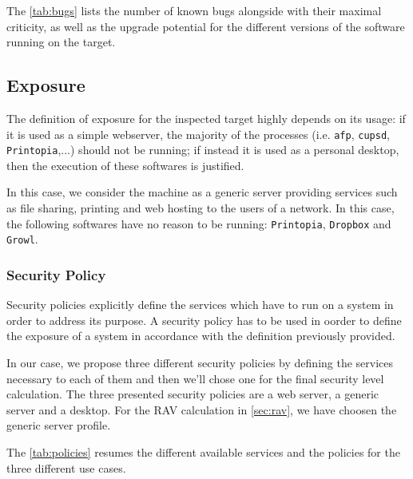 \documentclass[10pt,a4paper,twoside,onecolumn]{article}
\begin{document}
The \autoref{tab:bugs} lists the number of known bugs alongside with their maximal criticity, as well as the upgrade potential for the different versions of the software running on the target.


\subsection{Exposure}

The definition of exposure for the inspected target highly depends on its usage: if it is used as a simple webserver, the majority of the processes (i.e. \texttt{afp}, \texttt{cupsd}, \texttt{Printopia},...) should not be running; if instead it is used as a personal desktop, then the execution of these softwares is justified.

In this case, we consider the machine as a generic server providing services such as file sharing, printing and web hosting to the users of a network. In this case, the following softwares have no reason to be running: \texttt{Printopia}, \texttt{Dropbox} and \texttt{Growl}.

\subsubsection{Security Policy}

Security policies explicitly define the services which have to run on a system in order to address its purpose. A security policy has to be used in oorder to define the exposure of a system in accordance with the definition previously provided.

In our case, we propose three different security policies by defining the services necessary to each of them and then we'll chose one for the final security level calculation. The three presented security policies are a web server, a generic server and a desktop. For the RAV calculation in \autoref{sec:rav}, we have choosen the generic server profile.

The \autoref{tab:policies} resumes the different available services and the policies for the three different use cases.
\end{document}
